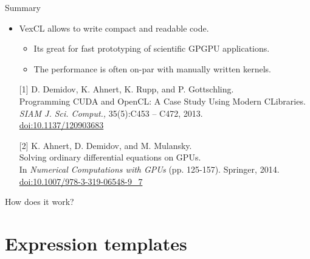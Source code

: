 \documentclass[@BEAMER_OPTIONS@]{beamer}
\newcommand{\CXX}{{\rm C}\plusplus}
\begin{document}
\note{ }

\begin{frame}[fragile]{Summary}
    \begin{itemize}
        \item VexCL allows to write compact and readable code.
            \begin{itemize}
                \item Its great for fast prototyping of scientific GPGPU
                    applications.
                \item The performance is often on-par with manually written
                    kernels.
            \end{itemize}
    \end{itemize}
    \vspace{\baselineskip}
    \begin{itemize}
        \item[{[1]}] D. Demidov, K. Ahnert, K. Rupp, and P. Gottschling.\\
            Programming CUDA and OpenCL: A Case Study Using Modern \CXX Libraries.\\
            \emph{SIAM J. Sci. Comput.,} 35(5):C453 – C472, 2013.\\
            \href{http://dx.doi.org/10.1137/120903683}{doi:10.1137/120903683}
        \item[{[2]}] K. Ahnert, D. Demidov, and M. Mulansky.\\
            Solving ordinary differential equations on GPUs.\\
            In \emph{Numerical Computations with GPUs} (pp. 125-157).  Springer, 2014.
            \href{http://dx.doi.org/10.1007/978-3-319-06548-9\_7}{doi:10.1007/978-3-319-06548-9\_7}
    \end{itemize}
\end{frame}

\note{ }

\begin{frame}
    \begin{center}
        \huge{How does it work?}
    \end{center}
\end{frame}

\note{ }

\section{Expression templates}
\begin{frame}
    \sectionpage
\end{frame}
\end{document}
